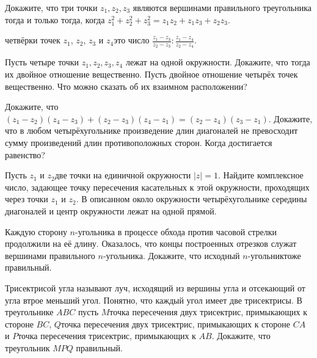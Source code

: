 \documentclass[a4paper,12pt]{article}
\begin{document}
Докажите, что три точки $z_1,z_2,z_3$ являются вершинами правильного треугольника тогда и только тогда, когда $z_1^2+z_2^2+z_3^2=z_1z_2+z_1z_3+z_2z_3$.

 четвёрки точек $z_1$, $z_2$, $z_3$ и $z_4$\т это число $\displaystyle\frac{z_1-z_3}{z_2-z_3}:\frac{z_1-z_4}{z_2-z_4}$.

Пусть четыре точки $z_1,z_2,z_3,z_4$ лежат на одной окружности. Докажите, что тогда их двойное отношение вещественно.
Пусть двойное отношение четырёх точек вещественно. Что можно сказать об их взаимном расположении?

 Докажите, что $(z_1-z_2)(z_4-z_3)+(z_2-z_3)(z_4-z_1)=(z_2-z_4)(z_3-z_1)$.
Докажите, что в любом четырёхугольнике произведение длин диагоналей не превосходит сумму произведений длин противоположных сторон. Когда достигается равенство?

Пусть $z_1$ и $z_2$\т две точки на единичной окружности $|z|=1$. Найдите комплексное число, задающее точку пересечения касательных к этой окружности, проходящих через точки $z_1$ и $z_2$.
В описанном около окружности четырёхугольнике середины диагоналей и центр окружности лежат на одной прямой.

Каждую сторону $n$-угольника в процессе обхода против часовой стрелки продолжили на её длину. Оказалось, что концы построенных отрезков служат вершинами правильного $n$-угольника. Докажите, что исходный $n$-угольник\т тоже правильный.

Трисектрисой угла называют луч, исходящий из вершины угла и отсекающий от угла втрое меньший угол. Понятно, что каждый угол имеет две трисектрисы. В треугольнике $ABC$ пусть $M$\т точка пересечения двух трисектрис, примыкающих к стороне $BC$, $Q$\т точка пересечения двух трисектрис, примыкающих к стороне $CA$ и $P$\т точка пересечения трисектрис, примыкающих к $AB$. Докажите, что треугольник $MPQ$ правильный.

\end{document}
